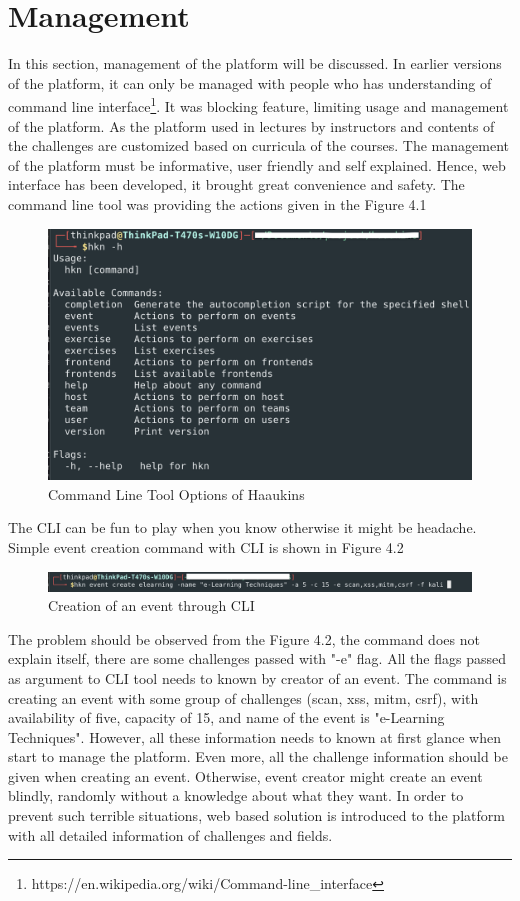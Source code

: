 \chapter{Management}

In this section, management of the platform will be discussed. In earlier versions of the platform, it can only be managed with people who has understanding of command line interface\footnote{https://en.wikipedia.org/wiki/Command-line_interface}. It was blocking feature, limiting usage and management of the platform. As the platform used in lectures by instructors and contents of the challenges are customized based on curricula of the courses. The management of the platform must be informative, user friendly and self explained. Hence, web interface has been developed, it brought great convenience and safety. 
The command line tool was providing the actions given in the Figure 4.1

\begin{figure}[htbp]
\centerline{\includegraphics[scale=.6]{figures/cli.png}}
\caption{Command Line Tool Options of Haaukins }
\label{fig}
\end{figure}

The CLI can be fun to play when you know otherwise it might be headache. Simple event creation command with CLI is shown in Figure 4.2
\begin{figure}[htbp]
\centerline{\includegraphics[scale=.6]{figures/create-event.png}}
\caption{Creation of an event through CLI }
\label{fig}
\end{figure}
\newpage
The problem should be observed from the Figure 4.2, the command does not explain itself, there are some challenges passed with "-e" flag. All the flags passed as argument to CLI tool needs to known by creator of an event. The command is creating an event with some group of challenges (scan, xss, mitm, csrf), with availability of five, capacity of 15, and name of the event is "e-Learning Techniques". However, all these information needs to known at first glance when start to manage the platform. Even more, all the challenge information should be given when creating an event. Otherwise, event creator might create an event blindly, randomly without a knowledge about what they want. 
In order to prevent such terrible situations, web based solution is introduced to the platform with all detailed information of challenges and fields. 

